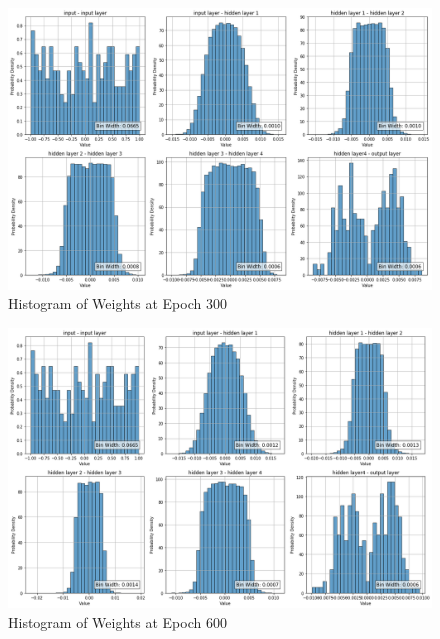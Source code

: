 \documentclass{ioereport}
\begin{document}
    \begin{figure}[H]
        \centering
        \includegraphics[width=\linewidth]{assets/audio histogram/epoch300Weight.png}
        \caption{Histogram of Weights at Epoch 300}
        \label{fig:audio-weight-300}
    \end{figure}

    \begin{figure}[H]
        \centering
        \includegraphics[width=\linewidth]{assets/audio histogram/epoch600Weight.png}
        \caption{Histogram of Weights at Epoch 600}
        \label{fig:audio-weight-600}
    \end{figure}
\end{document}
